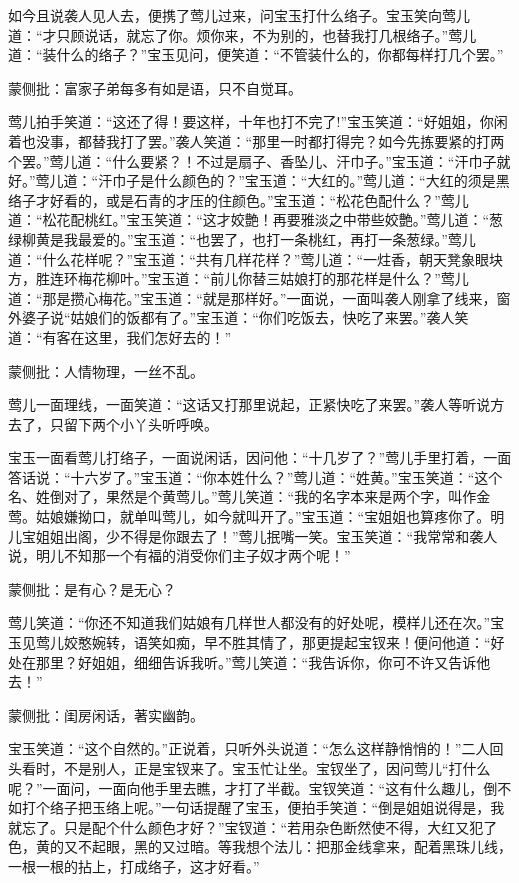 \begin{parag}
    如今且说袭人见人去，便携了莺儿过来，问宝玉打什么络子。宝玉笑向莺儿道：“才只顾说话，就忘了你。烦你来，不为别的，也替我打几根络子。”莺儿道：“装什么的络子？”宝玉见问，便笑道：“不管装什么的，你都每样打几个罢。”\begin{note}蒙侧批：富家子弟每多有如是语，只不自觉耳。\end{note}莺儿拍手笑道：“这还了得！要这样，十年也打不完了!”宝玉笑道：“好姐姐，你闲着也没事，都替我打了罢。”袭人笑道：“那里一时都打得完？如今先拣要紧的打两个罢。”莺儿道：“什么要紧？！不过是扇子、香坠儿、汗巾子。”宝玉道：“汗巾子就好。”莺儿道：“汗巾子是什么颜色的？”宝玉道：“大红的。”莺儿道：“大红的须是黑络子才好看的，或是石青的才压的住颜色。”宝玉道：“松花色配什么？”莺儿道：“松花配桃红。”宝玉笑道：“这才姣艶！再要雅淡之中带些姣艶。”莺儿道：“葱绿柳黄是我最爱的。”宝玉道：“也罢了，也打一条桃红，再打一条葱绿。”莺儿道：“什么花样呢？”宝玉道：“共有几样花样？”莺儿道：“一炷香，朝天凳象眼块方，胜连环梅花柳叶。”宝玉道：“前儿你替三姑娘打的那花样是什么？”莺儿道：“那是攒心梅花。”宝玉道：“就是那样好。”一面说，一面叫袭人刚拿了线来，窗外婆子说“姑娘们的饭都有了。”宝玉道：“你们吃饭去，快吃了来罢。”袭人笑道：“有客在这里，我们怎好去的！”\begin{note}蒙侧批：人情物理，一丝不乱。\end{note}莺儿一面理线，一面笑道：“这话又打那里说起，正紧快吃了来罢。”袭人等听说方去了，只留下两个小丫头听呼唤。
\end{parag}


\begin{parag}
    宝玉一面看莺儿打络子，一面说闲话，因问他：“十几岁了？”莺儿手里打着，一面答话说：“十六岁了。”宝玉道：“你本姓什么？”莺儿道：“姓黄。”宝玉笑道：“这个名、姓倒对了，果然是个黄莺儿。”莺儿笑道：“我的名字本来是两个字，叫作金莺。姑娘嫌拗口，就单叫莺儿，如今就叫开了。”宝玉道：“宝姐姐也算疼你了。明儿宝姐姐出阁，少不得是你跟去了！”莺儿抿嘴一笑。宝玉笑道：“我常常和袭人说，明儿不知那一个有福的消受你们主子奴才两个呢！”\begin{note}蒙侧批：是有心？是无心？\end{note}莺儿笑道：“你还不知道我们姑娘有几样世人都没有的好处呢，模样儿还在次。”宝玉见莺儿姣憨婉转，语笑如痴，早不胜其情了，那更提起宝钗来！便问他道：“好处在那里？好姐姐，细细告诉我听。”莺儿笑道：“我告诉你，你可不许又告诉他去！”\begin{note}蒙侧批：闺房闲话，著实幽韵。\end{note}宝玉笑道：“这个自然的。”正说着，只听外头说道：“怎么这样静悄悄的！”二人回头看时，不是别人，正是宝钗来了。宝玉忙让坐。宝钗坐了，因问莺儿“打什么呢？”一面问，一面向他手里去瞧，才打了半截。宝钗笑道：“这有什么趣儿，倒不如打个络子把玉络上呢。”一句话提醒了宝玉，便拍手笑道：“倒是姐姐说得是，我就忘了。只是配个什么颜色才好？”宝钗道：“若用杂色断然使不得，大红又犯了色，黄的又不起眼，黑的又过暗。等我想个法儿：把那金线拿来，配着黑珠儿线，一根一根的拈上，打成络子，这才好看。”
\end{parag}


